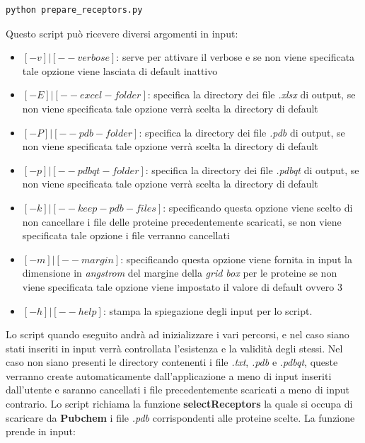 \begin{lstlisting}[language=Python, label=lst:code11, caption={funzione prepare\_receptors}]
python prepare_receptors.py
\end{lstlisting}

Questo script può ricevere diversi argomenti in input:

\begin{itemize}
    \item $[-v] | [--verbose]$: serve per attivare il verbose e se non viene specificata tale opzione viene lasciata di default inattivo
    \item $[-E] | [--excel-folder]$: specifica la directory dei file \textit{.xlsx} di output, se non viene specificata tale opzione verrà scelta la directory di default
    \item $[-P] | [--pdb-folder]$: specifica la directory dei file \textit{.pdb} di output, se non viene specificata tale opzione verrà scelta la directory di default
    \item $[-p] | [--pdbqt-folder]$: specifica la directory dei file \textit{.pdbqt} di output, se non viene specificata tale opzione verrà scelta la directory di default
    \item $[-k] | [--keep-pdb-files]$: specificando questa opzione viene scelto di non cancellare i file delle proteine precedentemente scaricati, se non viene specificata tale opzione i file verranno cancellati
    \item $[-m] | [--margin]$: specificando questa opzione viene fornita in input la dimensione in \textit{angstrom} del margine della \textit{grid box} per le proteine se non viene specificata tale opzione viene impostato il valore di default ovvero 3
    \item $[-h] | [--help]$: stampa la spiegazione degli input per lo script.
\end{itemize}

Lo script quando eseguito andrà ad inizializzare i vari percorsi, e nel caso siano stati inseriti in input verrà controllata l'esistenza e la validità degli stessi. Nel caso non siano presenti le directory contenenti i file \textit{.txt}, \textit{.pdb} e .\textit{pdbqt}, queste verranno create automaticamente dall'applicazione a meno di input inseriti dall'utente e saranno cancellati i file precedentemente scaricati a meno di input contrario.\newline
Lo script richiama la funzione \textbf{selectReceptors} la quale si occupa di scaricare da \textbf{Pubchem} i file \textit{.pdb} corrispondenti alle proteine scelte. La funzione prende in input: 

